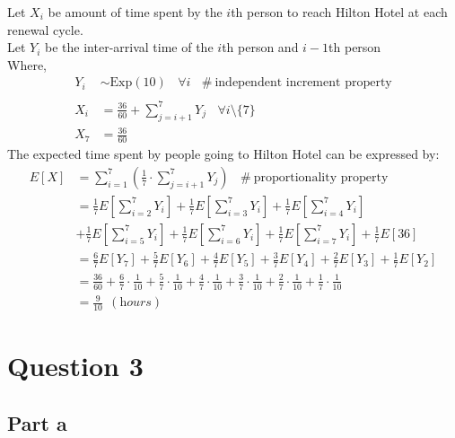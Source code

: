 \documentclass[a4paper, fleqn]{article}
\begin{document}
Let $X_i$ be amount of time spent by the $i$th person to reach Hilton Hotel at each renewal cycle.\\
Let $Y_i$ be the inter-arrival time of the $i$th person and $i-1$th person  \\
Where,
$$
\begin{aligned}
Y_i&\sim\text{Exp}(10)\ \ \ \ \forall i\ \ \ \ \#\ \text{independent increment property}\\\\
X_i&=\frac{36}{60}+\sum_{j=i+1}^7Y_j\ \ \ \ \forall i \setminus\{7\}\\
X_7&=\frac{36}{60}
\end{aligned}
$$
The expected time spent by people going to Hilton Hotel can be expressed by:
$$
\begin{aligned}
E[X]&= \sum_{i=1}^7\left(\frac{1}{7}\cdot\sum_{j=i+1}^7Y_j\right)\ \ \ \ \#\ \text{proportionality property}\\
&=\frac{1}{7}E\left[\sum_{i=2}^7Y_i\right]+\frac{1}{7}E\left[\sum_{i=3}^7Y_i\right]+\frac{1}{7}E\left[\sum_{i=4}^7Y_i\right]\\&+\frac{1}{7}E\left[\sum_{i=5}^7Y_i\right]+\frac{1}{7}E\left[\sum_{i=6}^7Y_i\right]+\frac{1}{7}E\left[\sum_{i=7}^7Y_i\right]+\frac{1}{7}E[36]\\
&=\frac{6}{7}E[Y_7]+\frac{5}{7}E[Y_6]+\frac{4}{7}E[Y_5]+\frac{3}{7}E[Y_4]+\frac{2}{7}E[Y_3]+\frac{1}{7}E[Y_2]\\
&= \frac{36}{60}+\frac{6}{7}\cdot\frac{1}{10}+\frac{5}{7}\cdot\frac{1}{10}+\frac{4}{7}\cdot\frac{1}{10}+\frac{3}{7}\cdot\frac{1}{10}+\frac{2}{7}\cdot\frac{1}{10}+\frac{1}{7}\cdot\frac{1}{10}\\
&=\frac{9}{10}\ \ (\textit{hours})
\end{aligned}
$$
\pagebreak
\section{Question 3}

\subsection{Part a}
\end{document}
